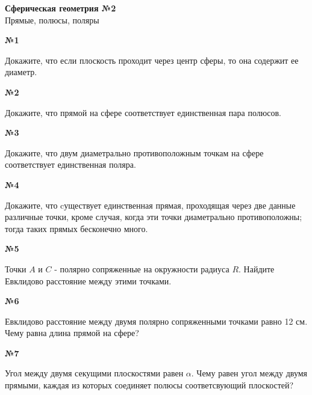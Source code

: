 


    \begin{center}
        \textbf{Сферическая геометрия №2}\\
        Прямые, полюсы, поляры
    \end{center}

    \begin{center}
        \textbf{№1}
    \end{center}

    Докажите, что если плоскость проходит через центр сферы, то она содержит ее диаметр.
    \begin{center}
        \textbf{№2}
    \end{center}

    Докажите, что прямой на сфере соответствует единственная пара полюсов.

    \begin{center}
        \textbf{№3}
    \end{center}

    Докажите, что двум диаметрально противоположным точкам на сфере соответствует единственная поляра.

    \begin{center}
        \textbf{№4}
    \end{center}

    Докажите, что cуществует единственная прямая, проходящая через две данные различные точки,
    кроме случая, когда эти точки диаметрально противоположны;
    тогда таких прямых бесконечно много.

    \begin{center}
        \textbf{№5}
    \end{center}

    Точки $A$ и $C$ - полярно сопряженные на окружности радиуса $R$.
    Найдите Евклидово расстояние между этими точками.

    \begin{center}
        \textbf{№6}
    \end{center}

    Евклидово расстояние между двумя полярно сопряженными точками равно 12 см.
    Чему равна длина прямой на сфере?

    \begin{center}
        \textbf{№7}
    \end{center}

    Угол между двумя секущими плоскостями равен $\alpha$.
    Чему равен угол между двумя прямыми,
    каждая из которых соединяет полюсы соответсвующий плоскостей?

